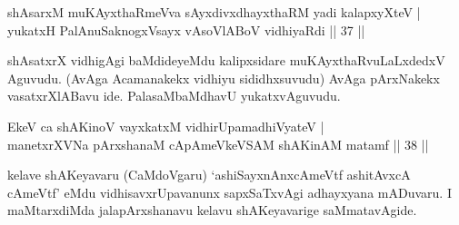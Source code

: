 \begin{shl}
shAsarxM muKAyxthaRmeVva sAyxdivxdhayxthaRM yadi kalapxyXteV | \\
yukatxH PalAnuSaknogxV\s sayx vAsoVlABoV vidhiyaRdi \hfill|| 37 || 
\end{shl}

\begin{artha}
shAsatxrX vidhigAgi baMdideyeMdu kalipxsidare muKAyxthaRvuLaLxdedxV Aguvudu. (AvAga Acamanakekx vidhiyu sididhxsuvudu) AvAga pArxNakekx vasatxrXlABavu ide. PalasaMbaMdhavU yukatxvAguvudu.
\end{artha}

\begin{shl}
EkeV ca shAKinoV vayxkatxM vidhirUpamadhiVyateV | \\
manetxrXVNa pArxshanaM cApAmeVkeVSAM shAKinAM matamf \hfill|| 38 || 
\end{shl}

\begin{artha}
kelave shAKeyavaru (CaMdoVgaru) `ashiSayxnAnxcAmeVtf ashitAvxcA cAmeVtf' eMdu vidhisavxrUpavanunx sapxSaTxvAgi adhayxyana mADuvaru. I maMtarxdiMda jalapArxshanavu kelavu shAKeyavarige saMmatavAgide.
\end{artha}

